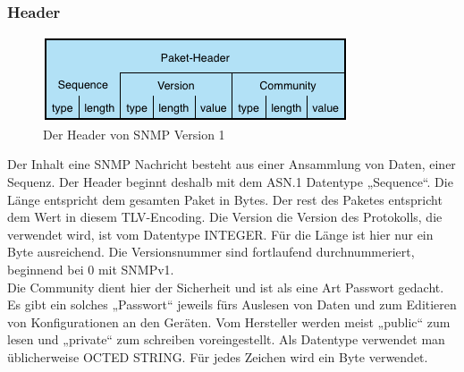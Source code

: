 \documentclass[11pt,a4paper]{article}
\begin{document}
\subsubsection{Header}
\begin{figure}[h]
	\centering
	\includegraphics[scale=1]{Bilder/SNMPv1-Header.png}
	\caption{Der Header von SNMP Version 1}
\end{figure}
Der Inhalt eine SNMP Nachricht besteht aus einer Ansammlung von Daten, einer Sequenz. Der Header beginnt deshalb mit dem ASN.1 Datentype „Sequence“. Die Länge entspricht dem gesamten Paket in Bytes. Der rest des Paketes entspricht dem Wert in diesem TLV-Encoding.
Die Version die Version des Protokolls, die verwendet wird, ist vom Datentype INTEGER. Für die Länge ist hier nur ein Byte ausreichend. Die Versionsnummer sind fortlaufend durchnummeriert, beginnend bei 0 mit SNMPv1.\\
Die Community dient hier der Sicherheit und ist als eine Art Passwort gedacht. Es gibt ein solches „Passwort“ jeweils fürs Auslesen von Daten und zum Editieren von Konfigurationen an den Geräten. Vom Hersteller werden meist „public“ zum lesen und „private“ zum schreiben voreingestellt. Als Datentype verwendet man üblicherweise OCTED STRING. Für jedes Zeichen wird ein Byte verwendet.\\
\end{document}
